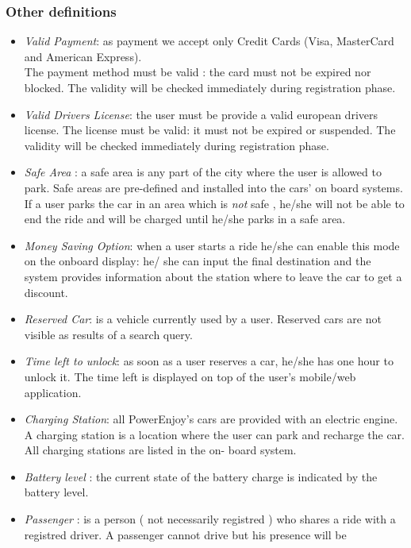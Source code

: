 \documentclass[12pt]{article}
\begin{document}
	 \subsubsection{Other definitions}
	 \begin{itemize}
		\item \textit{Valid Payment}: as payment we accept only Credit Cards (Visa, MasterCard 
			  and American Express).\\The payment method must be valid : the card must not be 
			  expired nor blocked. The validity will be checked immediately during registration 
			  phase.
		\item \textit{Valid Drivers License}: the user must be provide a valid european drivers 
			  license. The license must be valid: it must not be expired or suspended. The 
			  validity will be checked immediately during registration phase. 
		\item \textit{Safe Area} : a safe area is any part of the city where the user is 
			  allowed to park. Safe areas are pre-defined and installed into the cars' on board 
			  systems. If a user parks the car in an area which is \textit{not} safe , he/she 
			  will not be able to end the ride and will be charged until he/she parks in a safe 
			  area.
		\item \textit{Money Saving Option}: when a user starts a ride he/she can enable this 
			  mode on the onboard display: he/ she can input the final destination and the 
			  system provides information about the station where to leave the car to get a 
			  discount.
		\item \textit{Reserved Car}:  is a vehicle currently used by a user. Reserved cars are 
			  not visible as results of a search query.
		\item \textit{Time left to unlock}: as soon as a user reserves a car, he/she has one 
			  hour to unlock it. The time left is displayed on top of the user's mobile/web 
			  application.
		\item \textit{Charging Station}: all PowerEnjoy's cars are provided with an electric 
			  engine. A charging station is a location where the user can park and recharge the 
			  car. All charging stations are listed in the on- board system.
		\item \textit{Battery level} : the current state of the battery charge is indicated by 
			  the battery level.
		\item \textit{Passenger} : is a person ( not necessarily registred ) who shares a ride 
			  with a registred driver. A passenger cannot drive but his presence will be 	

\end{itemize}
\end{document}
